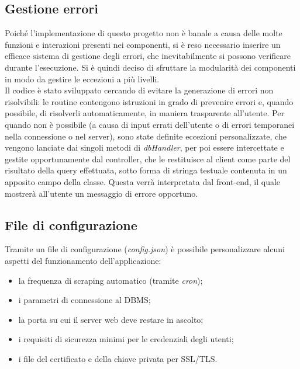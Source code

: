 \documentclass[11pt]{report}
\begin{document}
\subsection{Gestione errori}
Poiché l'implementazione di questo progetto non è banale a causa delle molte funzioni e interazioni presenti nei componenti, si è reso necessario inserire un efficace sistema di gestione degli errori, che inevitabilmente si possono verificare durante l'esecuzione.
Si è quindi deciso di sfruttare la modularità dei componenti in modo da gestire le eccezioni a più livelli.
\\Il codice è stato sviluppato cercando di evitare la generazione di errori non risolvibili: le routine contengono istruzioni in grado di prevenire errori e, quando possibile, di risolverli automaticamente, in maniera trasparente all'utente.
Per quando non è possibile (a causa di input errati dell'utente o di errori temporanei nella connessione o nel server), sono state definite eccezioni personalizzate, che vengono lanciate dai singoli metodi di \textit{dbHandler}, per poi essere intercettate e gestite opportunamente dal controller, che le restituisce al client come parte del risultato della query effettuata, sotto forma di stringa testuale contenuta in un apposito campo della classe.
Questa verrà interpretata dal front-end, il quale mostrerà all'utente un messaggio di errore opportuno.
\subsection{File di configurazione}
Tramite un file di configurazione (\textit{config.json}) è possibile personalizzare alcuni aspetti del funzionamento dell'applicazione:
\begin{itemize}
	\item la frequenza di scraping automatico (tramite \textit{cron});
	\item i parametri di connessione al DBMS;
	\item la porta su cui il server web deve restare in ascolto;
	\item i requisiti di sicurezza minimi per le credenziali degli utenti;
	\item i file del certificato e della chiave privata per SSL/TLS.
\end{itemize}
\pagebreak
\end{document}
